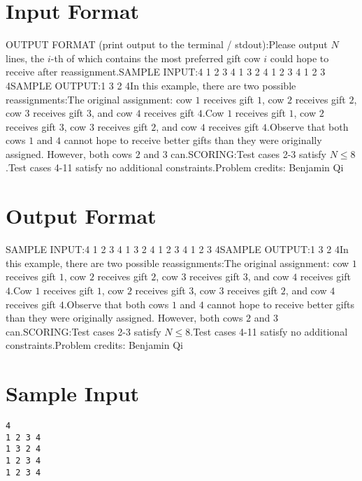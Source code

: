 \documentclass[12pt]{article}
\begin{document}
\section*{Input Format}
OUTPUT FORMAT (print output to the terminal / stdout):Please output $N$ lines, the $i$-th of which contains the 
most preferred gift cow $i$ could hope to receive after reassignment.SAMPLE INPUT:4
1 2 3 4
1 3 2 4
1 2 3 4
1 2 3 4SAMPLE OUTPUT:1
3
2
4In this example, there are two possible reassignments:The original assignment: cow $1$ receives gift $1$, cow $2$ receives gift
$2$, cow $3$ receives gift $3$, and cow $4$ receives gift $4$.Cow $1$ receives gift $1$, cow $2$ receives gift $3$, cow $3$ receives gift
$2$, and cow $4$ receives gift $4$.Observe that both cows $1$ and $4$ cannot hope to receive better gifts than they
were originally assigned. However, both cows $2$ and $3$ can.SCORING:Test cases 2-3 satisfy $N\le 8$.Test cases 4-11 satisfy no additional constraints.Problem credits: Benjamin Qi

\section*{Output Format}
SAMPLE INPUT:4
1 2 3 4
1 3 2 4
1 2 3 4
1 2 3 4SAMPLE OUTPUT:1
3
2
4In this example, there are two possible reassignments:The original assignment: cow $1$ receives gift $1$, cow $2$ receives gift
$2$, cow $3$ receives gift $3$, and cow $4$ receives gift $4$.Cow $1$ receives gift $1$, cow $2$ receives gift $3$, cow $3$ receives gift
$2$, and cow $4$ receives gift $4$.Observe that both cows $1$ and $4$ cannot hope to receive better gifts than they
were originally assigned. However, both cows $2$ and $3$ can.SCORING:Test cases 2-3 satisfy $N\le 8$.Test cases 4-11 satisfy no additional constraints.Problem credits: Benjamin Qi

\section*{Sample Input}
\begin{verbatim}
4
1 2 3 4
1 3 2 4
1 2 3 4
1 2 3 4
\end{verbatim}
\end{document}
